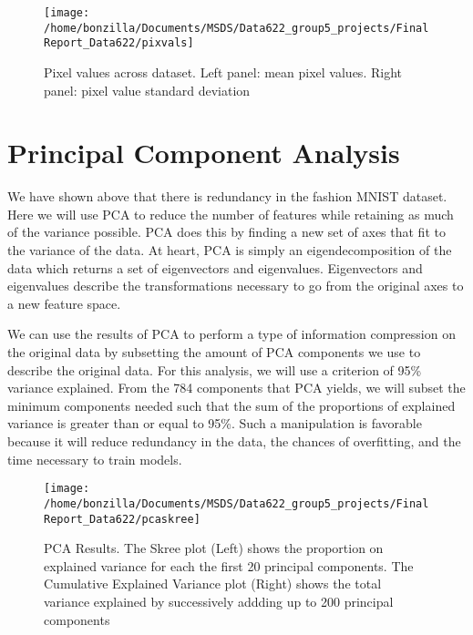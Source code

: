 \documentclass{article}
\begin{document}
\begin{figure}

{\centering \texttt{[image: /home/bonzilla/Documents/MSDS/Data622\_group5\_projects/FinalReport\_Data622/pixvals]} 

}

\caption{Pixel values across dataset. Left panel: mean pixel values. Right panel: pixel value standard deviation}\label{fig:unnamed-chunk-2}
\end{figure}

\hypertarget{principal-component-analysis}{%
\section{Principal Component
Analysis}\label{principal-component-analysis}}

\label{sec:headings}

We have shown above that there is redundancy in the fashion MNIST
dataset. Here we will use PCA to reduce the number of features while
retaining as much of the variance possible. PCA does this by finding a
new set of axes that fit to the variance of the data. At heart, PCA is
simply an eigendecomposition of the data which returns a set of
eigenvectors and eigenvalues. Eigenvectors and eigenvalues describe the
transformations necessary to go from the original axes to a new feature
space.

We can use the results of PCA to perform a type of information
compression on the original data by subsetting the amount of PCA
components we use to describe the original data. For this analysis, we
will use a criterion of 95\% variance explained. From the 784 components
that PCA yields, we will subset the minimum components needed such that
the sum of the proportions of explained variance is greater than or
equal to 95\%. Such a manipulation is favorable because it will reduce
redundancy in the data, the chances of overfitting, and the time
necessary to train models.

\begin{figure}

{\centering \texttt{[image: /home/bonzilla/Documents/MSDS/Data622\_group5\_projects/FinalReport\_Data622/pcaskree]} 

}

\caption{PCA Results. The Skree plot (Left) shows the proportion on explained variance for each the first 20 principal components. The Cumulative Explained Variance plot (Right) shows the total variance explained by successively addding up to 200 principal components}\label{fig:unnamed-chunk-3}
\end{figure}
\end{document}
